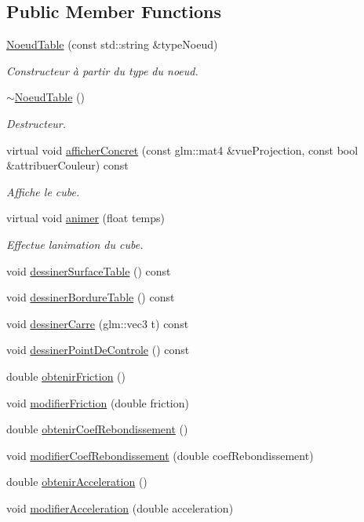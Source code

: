 \subsection*{Public Member Functions}
\begin{DoxyCompactItemize}
\item 
\hyperlink{group__inf2990_ga40983870720b331d17daeeb306e12ef5}{Noeud\+Table} (const std\+::string \&type\+Noeud)
\begin{DoxyCompactList}\small\item\em Constructeur à partir du type du noeud. \end{DoxyCompactList}\item 
\hyperlink{group__inf2990_ga6171c2df59de6f454f0d8c7915403ce7}{$\sim$\+Noeud\+Table} ()
\begin{DoxyCompactList}\small\item\em Destructeur. \end{DoxyCompactList}\item 
virtual void \hyperlink{group__inf2990_ga7e6bc962988899cf4ff7f2b1f9b51be9}{afficher\+Concret} (const glm\+::mat4 \&vue\+Projection, const bool \&attribuer\+Couleur) const
\begin{DoxyCompactList}\small\item\em Affiche le cube. \end{DoxyCompactList}\item 
virtual void \hyperlink{group__inf2990_gadf419e5147546815052d75529c4c45ab}{animer} (float temps)
\begin{DoxyCompactList}\small\item\em Effectue l\textquotesingle{}animation du cube. \end{DoxyCompactList}\item 
void \hyperlink{group__inf2990_gab35150586311b1ea123922289bdbd19a}{dessiner\+Surface\+Table} () const
\item 
void \hyperlink{group__inf2990_gabdc2ceea5a4344b1e6a2e0dfd3040e42}{dessiner\+Bordure\+Table} () const
\item 
void \hyperlink{group__inf2990_gaff1b1a929fc5f6022cf9756cea94e919}{dessiner\+Carre} (glm\+::vec3 t) const
\item 
void \hyperlink{group__inf2990_ga30e6df474cad3aeff4bd424f01cc2431}{dessiner\+Point\+De\+Controle} () const
\item 
double \hyperlink{group__inf2990_ga5dd809bb85df5982004a4e6e55dad715}{obtenir\+Friction} ()
\item 
void \hyperlink{group__inf2990_ga7e936cac741c4716548cb69ffde1777d}{modifier\+Friction} (double friction)
\item 
double \hyperlink{group__inf2990_ga6dd00515181d18b18cbc27292277b006}{obtenir\+Coef\+Rebondissement} ()
\item 
void \hyperlink{group__inf2990_ga3b11cdcbe4a4cf30095cd54083cd4019}{modifier\+Coef\+Rebondissement} (double coef\+Rebondissement)
\item 
double \hyperlink{group__inf2990_ga28011811ced7c04906780070a7762ec3}{obtenir\+Acceleration} ()
\item 
void \hyperlink{group__inf2990_ga1ac0745a780e04a265ee01bec42210e1}{modifier\+Acceleration} (double acceleration)
\end{DoxyCompactItemize}
